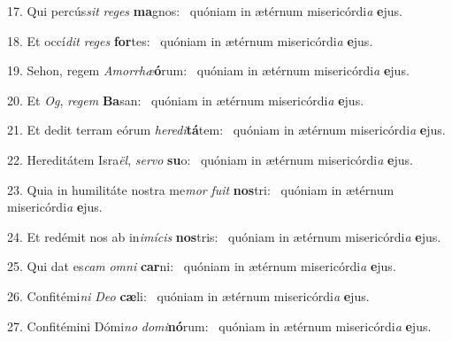 17. Qui percús\textit{sit} \textit{re}\textit{ges} \textbf{ma}gnos: \ast\  quóniam in ætérnum misericórdi\textit{a} \textbf{e}jus.\

18. Et occí\textit{dit} \textit{re}\textit{ges} \textbf{for}tes: \ast\  quóniam in ætérnum misericórdi\textit{a} \textbf{e}jus.\

19. Sehon, regem \textit{A}\textit{mor}\textit{rhæ}\textbf{ó}rum: \ast\  quóniam in ætérnum misericórdi\textit{a} \textbf{e}jus.\

20. Et \textit{Og}, \textit{re}\textit{gem} \textbf{Ba}san: \ast\  quóniam in ætérnum misericórdi\textit{a} \textbf{e}jus.\

21. Et dedit terram eórum \textit{he}\textit{re}\textit{di}\textbf{tá}tem: \ast\  quóniam in ætérnum misericórdi\textit{a} \textbf{e}jus.\

22. Hereditátem Isra\textit{ël}, \textit{ser}\textit{vo} \textbf{su}o: \ast\  quóniam in ætérnum misericórdi\textit{a} \textbf{e}jus.\

23. Quia in humilitáte nostra me\textit{mor} \textit{fu}\textit{it} \textbf{nos}tri: \ast\  quóniam in ætérnum misericórdi\textit{a} \textbf{e}jus.\

24. Et redémit nos ab in\textit{i}\textit{mí}\textit{cis} \textbf{nos}tris: \ast\  quóniam in ætérnum misericórdi\textit{a} \textbf{e}jus.\

25. Qui dat es\textit{cam} \textit{om}\textit{ni} \textbf{car}ni: \ast\  quóniam in ætérnum misericórdi\textit{a} \textbf{e}jus.\

26. Confitémi\textit{ni} \textit{De}\textit{o} \textbf{cæ}li: \ast\  quóniam in ætérnum misericórdi\textit{a} \textbf{e}jus.\

27. Confitémini Dómi\textit{no} \textit{do}\textit{mi}\textbf{nó}rum: \ast\  quóniam in ætérnum misericórdi\textit{a} \textbf{e}jus.\

